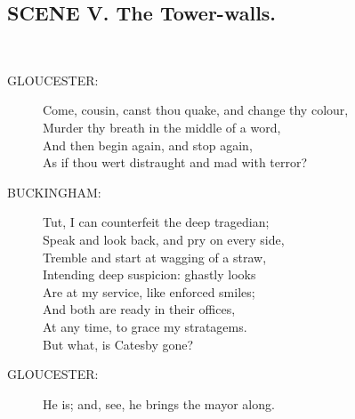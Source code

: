 \documentclass{article}
\begin{document}
\subsection*{SCENE V.  The Tower-walls.}
\\
\begin{description}
\item[GLOUCESTER:] 
\hspace{1pt}Come, cousin, canst thou quake, and change thy colour,\\
\hspace{1pt}Murder thy breath in the middle of a word,\\
\hspace{1pt}And then begin again, and stop again,\\
\hspace{1pt}As if thou wert distraught and mad with terror?\\
\end{description}
\begin{description}
\item[BUCKINGHAM:] 
\hspace{1pt}Tut, I can counterfeit the deep tragedian;\\
\hspace{1pt}Speak and look back, and pry on every side,\\
\hspace{1pt}Tremble and start at wagging of a straw,\\
\hspace{1pt}Intending deep suspicion: ghastly looks\\
\hspace{1pt}Are at my service, like enforced smiles;\\
\hspace{1pt}And both are ready in their offices,\\
\hspace{1pt}At any time, to grace my stratagems.\\
\hspace{1pt}But what, is Catesby gone?\\
\end{description}
\begin{description}
\item[GLOUCESTER:] 
\hspace{1pt}He is; and, see, he brings the mayor along.\\
\end{description}
\end{document}
